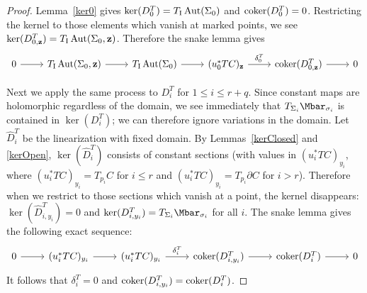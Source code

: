 \begin{proposition}
\begin{proof}
Lemma~\ref{ker0} gives $\ker(D_0^T)=T_{\text{I}}\operatorname{Aut}(\Sigma_0)$ and $\operatorname{coker}(D_0^T)=0$. Restricting the kernel to those elements which vanish at marked points, we see $\ker(D_{0,\bf{z}}^T)=T_{\text{I}}\operatorname{Aut}(\Sigma_0,\bf{z})$. Therefore the snake lemma gives
\begin{equation}
\begin{tikzcd}
0 \arrow[r] & T_{\text{I}}\Aut(\Sigma_0,\bf{z}) \arrow[r] & T_{\text{I}}\Aut(\Sigma_0) \arrow[r] & (u_0^*TC)_{\bf{z}} \arrow[r, "\delta_0^T"] & \coker(D_{0,\bf{z}}^T) \arrow[r] & 0
\end{tikzcd}
\label{snake0T}
\end{equation}

Next we apply the same process to $D_i^T$ for $1 \leq i \leq r+q$. Since constant maps are holomorphic regardless of the domain, we see immediately that $T_{\Sigma_i}\Mbar_{\sigma_i}$ is contained in $\ker(D_i^T)$; we can therefore ignore variations in the domain. Let $\hat{D}_i^T$ be the linearization with fixed domain. By Lemmas~\ref{kerClosed} and \ref{kerOpen}, $\ker(\hat{D}_i^T)$ consists of constant sections (with values in $(u_i^*TC)_{y_i}$, where $(u_i^*TC)_{y_i}=T_{p_i}C$ for $i \leq r$ and $(u_i^*TC)_{y_i}=T_{p_i}\partial C$ for $i>r$). Therefore when we restrict to those sections which vanish at a point, the kernel disappears: $\ker(\hat{D}_{i,y_i}^T)=0$ and $\ker(D_{i,y_i}^T)=T_{\Sigma_i}\Mbar_{\sigma_i}$ for all $i$. The snake lemma gives the following exact sequence:
\begin{equation}
\begin{tikzcd}
0 \arrow[r] & (u_i^*TC)_{y_i} \arrow[r] & (u_i^*TC)_{y_i} \arrow[r, "\delta_i^T"] & \coker(D_{i,y_i}^T) \arrow[r] & \coker(D_i^T) \arrow[r] & 0
\end{tikzcd}
\label{snakeiT}
\end{equation}
It follows that $\delta_i^T=0$ and $\operatorname{coker}(D_{i,y_i}^T)=\operatorname{coker}(D_i^T)$.


\end{proof}
\end{proposition}
